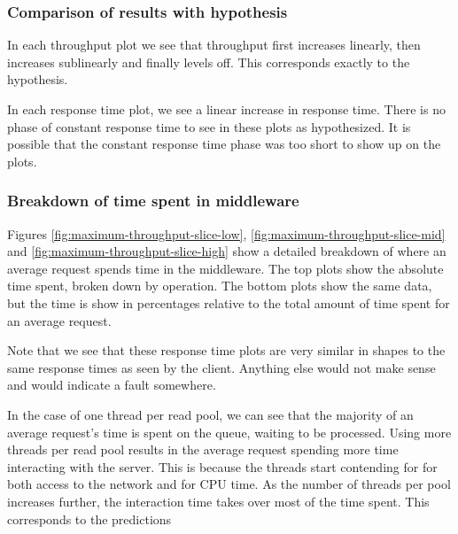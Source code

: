 \documentclass[11pt]{article}
\begin{document}
\subsubsection{Comparison of results with hypothesis}

In each throughput plot we see that throughput first increases linearly, then increases sublinearly and finally levels off.
This corresponds exactly to the hypothesis.

In each response time plot, we see a linear increase in response time.
There is no phase of constant response time to see in these plots as hypothesized.
It is possible that the constant response time phase was too short to show up on the plots.

\subsubsection{Breakdown of time spent in middleware}


Figures \ref{fig:maximum-throughput-slice-low}, \ref{fig:maximum-throughput-slice-mid} and \ref{fig:maximum-throughput-slice-high} show a detailed breakdown of where an average request spends time in the middleware.
The top plots show the absolute time spent, broken down by operation.
The bottom plots show the same data, but the time is show in percentages relative to the total amount of time spent for an average request.

Note that we see that these response time plots are very similar in shapes to the same response times as seen by the client.
Anything else would not make sense and would indicate a fault somewhere.

In the case of one thread per read pool, we can see that the majority of an average request's time is spent on the queue, waiting to be processed.
Using more threads per read pool results in the average request spending more time interacting with the server.
This is because the threads start contending for for both access to the network and for CPU time.
As the number of threads per pool increases further, the interaction time takes over most of the time spent.
This corresponds to the predictions
\end{document}
